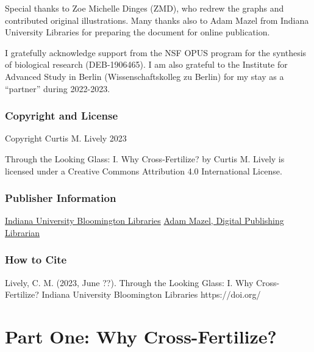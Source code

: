 \documentclass[
  letterpaper,
]{book}
\begin{document}
Special thanks to Zoe Michelle Dinges (ZMD), who redrew the graphs and
contributed original illustrations. Many thanks also to Adam Mazel from
Indiana University Libraries for preparing the document for online
publication.

I gratefully acknowledge support from the NSF OPUS program for the
synthesis of biological research (DEB-1906465). I am also grateful to
the Institute for Advanced Study in Berlin (Wissenschaftskolleg zu
Berlin) for my stay as a ``partner'' during 2022-2023.

\hypertarget{copyright-and-license}{%
\section*{Copyright and License}\label{copyright-and-license}}


Copyright Curtis M. Lively 2023

{Through the Looking Glass: I. Why Cross-Fertilize?} by Curtis M. Lively
is licensed under a Creative Commons Attribution 4.0 International
License.

\hypertarget{publisher-information}{%
\section*{Publisher Information}\label{publisher-information}}


\href{https://libraries.indiana.edu/}{Indiana University Bloomington
Libraries} \href{https://libraries.indiana.edu/adam-mazel}{Adam Mazel,
Digital Publishing Librarian}

\hypertarget{how-to-cite}{%
\section*{How to Cite}\label{how-to-cite}}


Lively, C. M. (2023, June ??). Through the Looking Glass: I. Why
Cross-Fertilize? Indiana University Bloomington Libraries
https://doi.org/

\part{Part One: Why Cross-Fertilize?}
\end{document}
